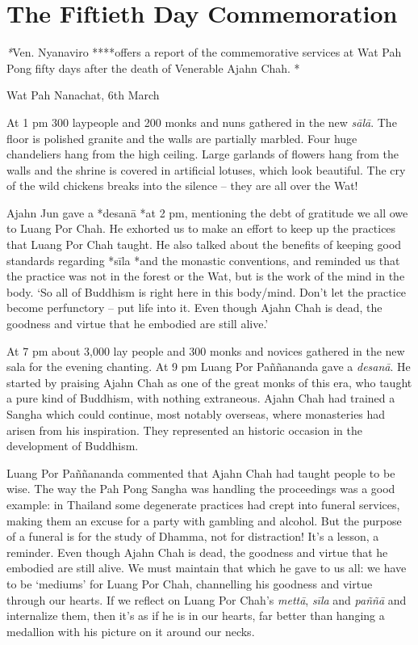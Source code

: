 \chapter{The Fiftieth Day Commemoration}

\emph{*}Ven. Nyanaviro ****offers a report of the
commemorative services at Wat Pah Pong fifty days after the death
of Venerable Ajahn Chah. *

Wat Pah Nanachat, 6th March

At 1 pm 300 laypeople and 200 monks and nuns gathered in the new
\emph{sālā}. The floor is polished granite and the walls are partially
marbled. Four huge chandeliers hang from the high ceiling. Large
garlands of flowers hang from the walls and the shrine is covered in
artificial lotuses, which look beautiful. The cry of the wild chickens
breaks into the silence -- they are all over the Wat! 

Ajahn Jun gave a *desanā *at 2 pm, mentioning the debt of gratitude we
all owe to Luang Por Chah. He exhorted us to make an effort to keep up
the practices that Luang Por Chah taught. He also talked about the
benefits of keeping good standards regarding *sīla *and the monastic
conventions, and reminded us that the practice was not in the forest or
the Wat, but is the work of the mind in the body. `So all of Buddhism is
right here in this body/mind. Don't let the practice become perfunctory
-- put life into it. Even though Ajahn Chah is dead, the goodness and
virtue that he embodied are still alive.'

At 7 pm about 3,000 lay people and 300 monks and novices gathered in the
new sala for the evening chanting. At 9 pm Luang Por Paññananda gave a
\emph{desanā}. He started by praising Ajahn Chah as one of the great
monks of this era, who taught a pure kind of Buddhism, with nothing
extraneous. Ajahn Chah had trained a Sangha which could continue, most
notably overseas, where monasteries had arisen from his inspiration. 
They represented an historic occasion in the development of Buddhism. 

Luang Por Paññananda commented that Ajahn Chah had taught people to be
wise. The way the Pah Pong Sangha was handling the proceedings was a
good example: in Thailand some degenerate practices had crept into
funeral services, making them an excuse for a party with gambling and
alcohol. But the purpose of a funeral is for the study of Dhamma, not
for distraction! It's a lesson, a reminder. Even though Ajahn Chah is
dead, the goodness and virtue that he embodied are still alive. We must
maintain that which he gave to us all: we have to be `mediums' for Luang
Por Chah, channelling his goodness and virtue through our hearts. If we
reflect on Luang Por Chah's \emph{mettā}, \emph{sīla} and \emph{paññā}
and internalize them, then it's as if he is in our hearts, far better
than hanging a medallion with his picture on it around our necks. 


